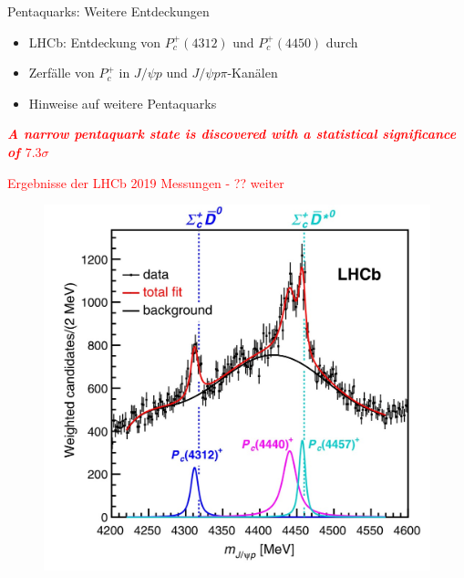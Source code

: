 \documentclass[aspectratio=169]{beamer} %
\begin{document}
    \begin{frame}{Pentaquarks: Weitere Entdeckungen}
      \begin{itemize}
        \item LHCb: Entdeckung von $P_c^+(4312)$ und $P_c^+(4450)$ durch \textcite{Aaij.2019}
        \item Zerfälle von $P_c^+$ in $J/\psi p$ und $J/\psi p\pi$-Kanälen
        \item Hinweise auf weitere Pentaquarks
      \end{itemize}
      \emph{\textcolor{red}{\textbf{A narrow pentaquark state is discovered with a statistical significance of $7.3\sigma$
            }}}
    \end{frame}


      \begin{frame}{\textcolor{red}{Ergebnisse der LHCb 2019 Messungen - ?? weiter}}
        \begin{minipage}{0.48\textwidth}
          \begin{figure}\includegraphics[width=\textwidth]{Images/76e29612-a8a4-4650-8573-5e331d33a362.jpg}%
            \\\protect\cite[S.~4]{Aaij.2019}\end{figure}
        \end{minipage}
        \hfill
        \begin{minipage}{0.48\textwidth}

\end{minipage}
\end{frame}
\end{document}
